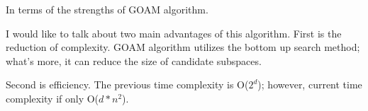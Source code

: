 \documentclass[
 size=14pt,
 paper=smartboard,  %
 mode=present, 		%
 display=slides, 	%
 style=tuliplab,  	%
 pauseslide,
 fleqn,leqno]{powerdot}
\begin{document}









\begin{note}
In terms of the strengths of GOAM algorithm.

I would like to talk about two main advantages of this algorithm.
First is the reduction of complexity.
GOAM algorithm utilizes the bottom up search method;
what's more,
it can reduce the size of candidate subspaces.

Second is efficiency.
The previous time complexity is O($2^d$);
however,
current time complexity if only O($d*n^2$).
\end{note}



\end{document}

